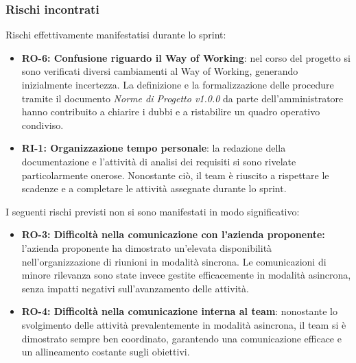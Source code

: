 \documentclass[a4paper,12pt]{article}
\begin{document}
{        \subsubsection{Rischi incontrati}{
            Rischi effettivamente manifestatisi durante lo sprint:
            \begin{itemize}
                \item \textbf{RO-6: Confusione riguardo il Way of Working}: nel corso del progetto si sono verificati diversi cambiamenti al Way of Working, generando inizialmente incertezza. La definizione e la formalizzazione delle procedure tramite il documento \textit{Norme di Progetto v1.0.0} da parte dell'amministratore hanno contribuito a chiarire i dubbi e a ristabilire un quadro operativo condiviso.
                \item \textbf{RI-1: Organizzazione tempo personale}: la redazione della documentazione e l'attività di analisi dei requisiti si sono rivelate particolarmente onerose. Nonostante ciò, il team è riuscito a rispettare le scadenze e a completare le attività assegnate durante lo sprint.
            \end{itemize}

            I seguenti rischi previsti non si sono manifestati in modo significativo:
            \begin{itemize}
                \item \textbf{RO-3: Difficoltà nella comunicazione con l'azienda proponente:} l'azienda proponente ha dimostrato un'elevata disponibilità nell'organizzazione di riunioni in modalità sincrona. Le comunicazioni di minore rilevanza sono state invece gestite efficacemente in modalità asincrona, senza impatti negativi sull'avanzamento delle attività.
                \item \textbf{RO-4: Difficoltà nella comunicazione interna al team}: nonostante lo svolgimento delle attività prevalentemente in modalità asincrona, il team si è dimostrato sempre ben coordinato, garantendo una comunicazione efficace e un allineamento costante sugli obiettivi.
            \end{itemize}
        }

}
\end{document}
